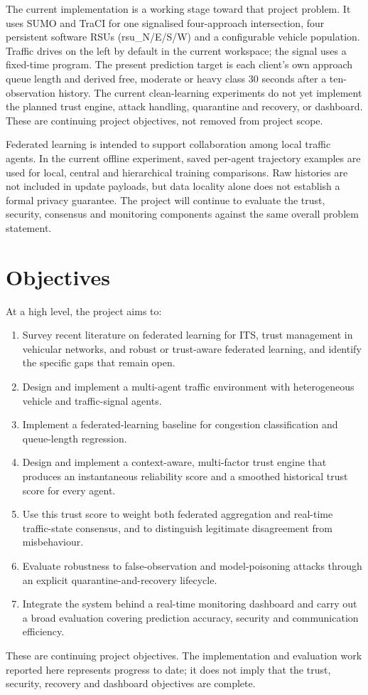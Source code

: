 The current implementation is a working stage toward that project problem. It uses SUMO and TraCI for one signalised four-approach intersection, four persistent software RSUs (rsu\_N/E/S/W) and a configurable vehicle population. Traffic drives on the left by default in the current workspace; the signal uses a fixed-time program. The present prediction target is each client's own approach queue length and derived free, moderate or heavy class 30 seconds after a ten-observation history. The current clean-learning experiments do not yet implement the planned trust engine, attack handling, quarantine and recovery, or dashboard. These are continuing project objectives, not removed from project scope.

Federated learning is intended to support collaboration among local traffic agents. In the current offline experiment, saved per-agent trajectory examples are used for local, central and hierarchical training comparisons. Raw histories are not included in update payloads, but data locality alone does not establish a formal privacy guarantee. The project will continue to evaluate the trust, security, consensus and monitoring components against the same overall problem statement.

\section{Objectives}
At a high level, the project aims to:
\begin{enumerate}
  \item Survey recent literature on federated learning for ITS, trust management in vehicular networks, and robust or trust-aware federated learning, and identify the specific gaps that remain open.
  \item Design and implement a multi-agent traffic environment with heterogeneous vehicle and traffic-signal agents.
  \item Implement a federated-learning baseline for congestion classification and queue-length regression.
  \item Design and implement a context-aware, multi-factor trust engine that produces an instantaneous reliability score and a smoothed historical trust score for every agent.
  \item Use this trust score to weight both federated aggregation and real-time traffic-state consensus, and to distinguish legitimate disagreement from misbehaviour.
  \item Evaluate robustness to false-observation and model-poisoning attacks through an explicit quarantine-and-recovery lifecycle.
  \item Integrate the system behind a real-time monitoring dashboard and carry out a broad evaluation covering prediction accuracy, security and communication efficiency.
\end{enumerate}
These are continuing project objectives. The implementation and evaluation work reported here represents progress to date; it does not imply that the trust, security, recovery and dashboard objectives are complete.

